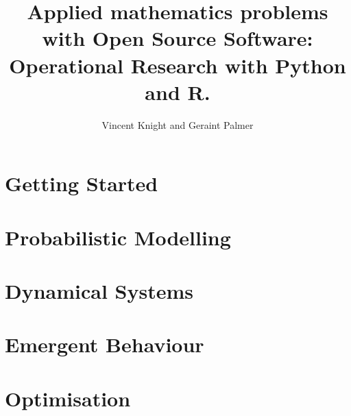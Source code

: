\documentclass[Alon2,singlecolor,11pt]{Alon}
\title{Applied mathematics problems with Open Source Software:
       Operational Research with Python and R.}
\author{Vincent Knight and Geraint Palmer}
\begin{document}
\frontmatter



\halftitle

\booktitle

\locpage



\cleardoublepage
\setcounter{page}{7} %
\tableofcontents






\mainmatter

\part{Getting Started}


\part{Probabilistic Modelling}


\part{Dynamical Systems}


\part{Emergent Behaviour}


\part{Optimisation}






\printindex
\cleardoublepage
\end{document}
